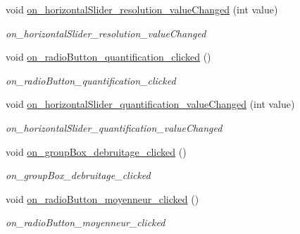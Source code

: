 \begin{DoxyCompactItemize}
void \hyperlink{classAppMainWindow_a6e8ec3bc33ddf2ccfb66ac9f2bdea798}{on\+\_\+horizontal\+Slider\+\_\+resolution\+\_\+value\+Changed} (int value)
\begin{DoxyCompactList}\small\item\em on\+\_\+horizontal\+Slider\+\_\+resolution\+\_\+value\+Changed \end{DoxyCompactList}\item 
\mbox{\label{classAppMainWindow_af4275338b582b00bb35f226a30eac478}} 
void \hyperlink{classAppMainWindow_af4275338b582b00bb35f226a30eac478}{on\+\_\+radio\+Button\+\_\+quantification\+\_\+clicked} ()
\begin{DoxyCompactList}\small\item\em on\+\_\+radio\+Button\+\_\+quantification\+\_\+clicked \end{DoxyCompactList}\item 
void \hyperlink{classAppMainWindow_a7b6f24303c07e1b41425bc08976a6d93}{on\+\_\+horizontal\+Slider\+\_\+quantification\+\_\+value\+Changed} (int value)
\begin{DoxyCompactList}\small\item\em on\+\_\+horizontal\+Slider\+\_\+quantification\+\_\+value\+Changed \end{DoxyCompactList}\item 
\mbox{\label{classAppMainWindow_a2ea10df6c5b039ddc398967690bc5436}} 
void \hyperlink{classAppMainWindow_a2ea10df6c5b039ddc398967690bc5436}{on\+\_\+group\+Box\+\_\+debruitage\+\_\+clicked} ()
\begin{DoxyCompactList}\small\item\em on\+\_\+group\+Box\+\_\+debruitage\+\_\+clicked \end{DoxyCompactList}\item 
\mbox{\label{classAppMainWindow_a9ae8a53aff8676113c49517bae7ba5d2}} 
void \hyperlink{classAppMainWindow_a9ae8a53aff8676113c49517bae7ba5d2}{on\+\_\+radio\+Button\+\_\+moyenneur\+\_\+clicked} ()
\begin{DoxyCompactList}\small\item\em on\+\_\+radio\+Button\+\_\+moyenneur\+\_\+clicked \end{DoxyCompactList}\item 
\mbox{\label{classAppMainWindow_aee4cb01973a657803e2d24bfb0a882c2}} 

\end{DoxyCompactItemize}
